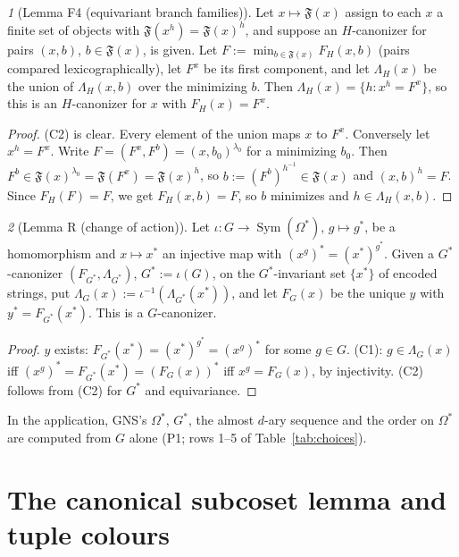\documentclass[11pt]{article}
\theoremstyle{plain}
\theoremstyle{definition}
\theoremstyle{remark}
\theoremstyle{named}
\newtheorem*{named}{}
\theoremstyle{namedrm}
\newcommand{\Sym}{\operatorname{Sym}}
\newcommand{\fF}{\mathfrak{F}}
\begin{document}
\begin{named}[Lemma F4 (equivariant branch families)]
Let $x\mapsto\fF(x)$ assign to each $x$ a finite set of objects with $\fF(x^h)=\fF(x)^h$, and suppose an
$H$-canonizer for pairs $(x,b)$, $b\in\fF(x)$, is given. Let $F:=\min_{b\in\fF(x)}F_H(x,b)$ (pairs compared
lexicographically), let $F^x$ be its first component, and let $\Lambda_H(x)$ be the union of
$\Lambda_H(x,b)$ over the minimizing $b$. Then $\Lambda_H(x)=\{h:x^h=F^x\}$, so this is an $H$-canonizer for
$x$ with $F_H(x)=F^x$.
\end{named}
\begin{proof}
(C2) is clear. Every element of the union maps $x$ to $F^x$. Conversely let $x^h=F^x$. Write
$F=(F^x,F^b)=(x,b_0)^{\lambda_0}$ for a minimizing $b_0$. Then $F^b\in\fF(x)^{\lambda_0}=\fF(F^x)=\fF(x)^h$, so
$b:=(F^b)^{h^{-1}}\in\fF(x)$ and $(x,b)^h=F$. Since $F_H(F)=F$, we get $F_H(x,b)=F$, so $b$ minimizes and
$h\in\Lambda_H(x,b)$.
\end{proof}

\begin{named}[Lemma R (change of action)]
Let $\iota\colon G\to\Sym(\Omega^*)$, $g\mapsto g^*$, be a homomorphism and $x\mapsto x^*$ an injective map
with $(x^g)^*=(x^*)^{g^*}$. Given a $G^*$-canonizer $(F_{G^*},\Lambda_{G^*})$, $G^*:=\iota(G)$, on the
$G^*$-invariant set $\{x^*\}$ of encoded strings, put
$\Lambda_G(x):=\iota^{-1}(\Lambda_{G^*}(x^*))$, and let $F_G(x)$ be the unique $y$ with $y^*=F_{G^*}(x^*)$. This
is a $G$-canonizer.
\end{named}
\begin{proof}
$y$ exists: $F_{G^*}(x^*)=(x^*)^{g^*}=(x^g)^*$ for some $g\in G$. (C1): $g\in\Lambda_G(x)$ iff
$(x^g)^*=F_{G^*}(x^*)=(F_G(x))^*$ iff $x^g=F_G(x)$, by injectivity. (C2) follows from (C2) for $G^*$ and
equivariance.
\end{proof}
In the application, GNS's $\Omega^*$, $G^*$, the almost $d$-ary sequence and the order on $\Omega^*$ are
computed from $G$ alone (P1; rows 1--5 of Table~\ref{tab:choices}).

\section{The canonical subcoset lemma and tuple colours}\label{sec:subcoset}
\end{document}
